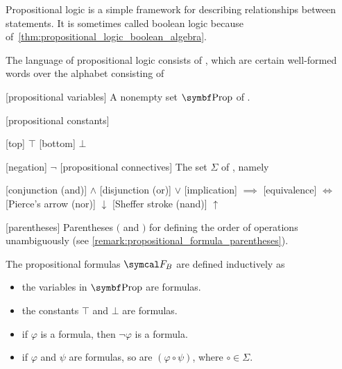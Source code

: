 \begin{definition}\label{def:propositional_logic_language}\cite[12]{Nerode2012}
  Propositional logic is a simple framework for describing relationships between statements. It is sometimes called boolean logic because of~\cref{thm:propositional_logic_boolean_algebra}.

  The language of propositional logic consists of , which are certain well-formed words over the alphabet consisting of
  \begin{description}
    [propositional variables] A nonempty set \( \Bold{Prop} \) of .

    [propositional constants]\mbox{}
    \begin{description}
      [top] \( \top \)
      [bottom] \( \bot \)
    \end{description}

    [negation] \( \neg \)
    [propositional connectives] The set \( \Sigma \) of , namely
    \begin{description}
      [conjunction (and)] \( \land \)
      [disjunction (or)] \( \lor \)
      [implication] \( \implies \)
      [equivalence] \( \iff \)
      [Pierce's arrow (nor)] \( \downarrow \)
      [Sheffer stroke (nand)] \( \uparrow \)
    \end{description}

    [parentheses] Parentheses \( ( \) and \( ) \) for defining the order of operations unambiguously (see \cref{remark:propositional_formula_parentheses}).
  \end{description}

  The propositional formulas \( \Cal{F}_B \) are defined inductively as
  \begin{itemize}
    \item the variables in \( \Bold{Prop} \) are formulas.
    \item the constants \( \top \) and \( \bot \) are formulas.
    \item if \( \varphi \) is a formula, then \( \neg \varphi \) is a formula.
    \item if \( \varphi \) and \( \psi \) are formulas, so are \( (\varphi \circ \psi) \), where \( \circ \in \Sigma \).
  \end{itemize}


\end{definition}
